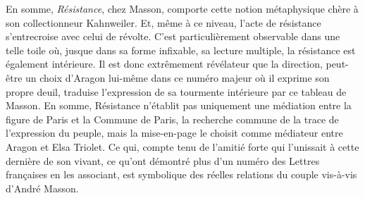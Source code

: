 	En somme, \emph{Résistance}, chez Masson, comporte cette notion métaphysique chère à son collectionneur Kahnweiler. Et, même à ce niveau, l’acte de résistance s’entrecroise avec celui de révolte. C’est particulièrement observable dans une telle toile où, jusque dans sa forme infixable, sa lecture multiple, la résistance est également intérieure. Il est donc extrêmement révélateur que la direction, peut-être un choix d’Aragon lui-même dans ce numéro majeur où il exprime son propre deuil, traduise l’expression de sa tourmente intérieure par ce tableau de Masson. En somme, Résistance n’établit pas uniquement une médiation entre la figure de Paris et la Commune de Paris, la recherche commune de la trace de l’expression du peuple, mais la mise-en-page le choisit comme médiateur entre Aragon et Elsa Triolet. Ce qui, compte tenu de l’amitié forte qui l’unissait à cette dernière de son vivant, ce qu’ont démontré plus d’un numéro des Lettres françaises en les associant, est symbolique des réelles relations du couple vis-à-vis d'André Masson. 